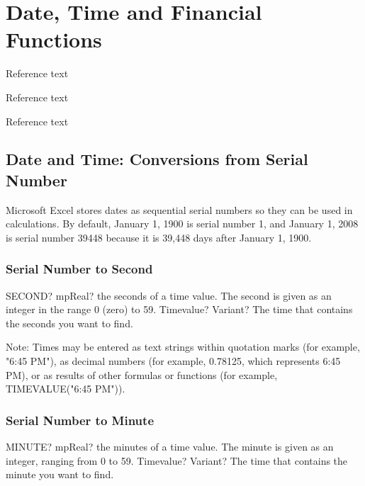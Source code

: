 \chapter{Date, Time and Financial Functions}
\label{ElementaryFinancialFunctions} 

Reference text \cite{Benninga2008}

Reference text \cite{Benninga2010}

Reference text \cite{Day_2010}

\section{Date and Time: Conversions from Serial Number}
Microsoft Excel stores dates as sequential serial numbers so they can be used in calculations. By default, January 1, 1900 is serial number 1, and January 1, 2008 is serial number 39448 because it is 39,448 days after January 1, 1900.



\subsection{Serial Number to Second}

\begin{mpFunctionsExtract}
	\mpWorksheetFunctionOneNotImplemented
	{SECOND? mpReal? the seconds of a time value. The second is given as an integer in the range 0 (zero) to 59.}
	{Timevalue? Variant? The time that contains the seconds you want to find.}
\end{mpFunctionsExtract}

\vspace{0.3cm}
Note: Times may be entered as text strings within quotation marks (for example, "6:45 PM"), as decimal numbers (for example, 0.78125, which represents 6:45 PM), or as results of other formulas or functions (for example, TIMEVALUE("6:45 PM")).



\subsection{Serial Number to Minute}

\begin{mpFunctionsExtract}
	\mpWorksheetFunctionOneNotImplemented
	{MINUTE? mpReal? the minutes of a time value. The minute is given as an integer, ranging from 0 to 59.}
	{Timevalue? Variant? The time that contains the minute you want to find.}
\end{mpFunctionsExtract}


